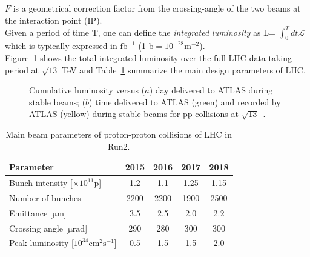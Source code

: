 $F$ is a geometrical correction factor from the crossing-angle of the two beams at the interaction point (IP). 
\\Given a period of time T, one can define the \textit{integrated luminosity} as L= $\int^{T}_{0}{dt \mathcal{L}}$ 
which is typically expressed in $\mathrm{fb^{-1}}$ (1 $\mathrm{b = 10^{-28} m^{-2}}$).
\\Figure~\ref{fig:lum} shows the total integrated luminosity over the full LHC data taking period at $\mathrm{\sqrt{13}}$ TeV and Table~\ref{tab:lum} summarize the main design parameters of LHC.
\begin{figure}[h]
	\centering
	\quad
	\quad
	\caption{Cumulative luminosity versus ($a$) day delivered to ATLAS during stable beams; ($b$) time delivered to ATLAS (green) and recorded by ATLAS (yellow) during stable beams for pp collisions at $\mathrm{\sqrt{13}}$~\cite{lumi}.}
	\label{fig:lum}
\end{figure}
\begin{table}[h]
	\begin{adjustbox}{max width=1.\textwidth,center}
		\begin{tabular}{lcccc}
			\hline 
			\textbf{Parameter}              											&  \textbf{2015} & \textbf{2016} 			& \textbf{2017} & \textbf{2018} \\ 
			\hline 
				Bunch intensity [$\mathrm{\times10^{11}p}$] 		  &  1.2 				  & 1.1 						  & 1.25 				& 1.15 				\\
				Number of bunches   												 &  2200 			   & 2200						 & 1900				  & 2500			\\
				Emittance [$\mathrm{\mu m}$] 							 	  & 3.5					  & 2.5 						  &2.0 					 & 2.2				 \\
				Crossing angle [$\mathrm{\mu rad}$] 					   & 290 				  & 280 						 & 300 				   & 300		      \\
				Peak luminosity [$\mathrm{10^{34} cm^{2}s^{-1}}$] 	& 0.5 					& 1.5 							& 1.5				   &  2.0				\\
			\hline  
		\end{tabular} 
	\end{adjustbox}
	\caption{Main beam parameters of proton-proton collisions of LHC in Run2.}
	\label{tab:lum}
\end{table} 
\FloatBarrier
